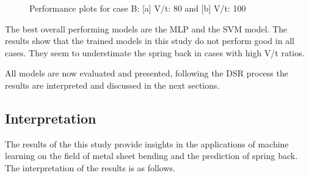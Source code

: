 \begin{figure}[h]
    \begin{tcolorbox}[arc=0pt,boxrule=0.5pt]
        \centering
        \caption{Performance plots for case B: [a] V/t: 80 and [b] V/t: 100}
        \label{fig:performance-case-c}
    \end{tcolorbox}
\end{figure}


The best overall performing models are the \ac{MLP} and the \ac{SVM} model.
The results show that the trained models in this study do not perform good in all cases.
They seem to understimate the spring back in cases with high V/t ratios.

All models are now evaluated and presented, following the DSR process the results are interpreted and discussed in
the next sections.


\subsection{Interpretation}\label{subsec:interpretation-of-results}

The results of the this study provide insights in the applications of machine learning on the field of metal sheet
bending and the prediction of spring back.
The interpretation of the results is as follows.

